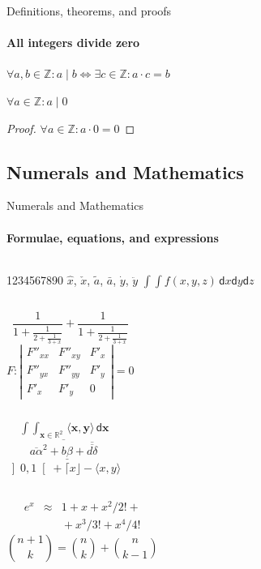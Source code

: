 \documentclass{beamer}
\begin{document}
\begin{frame}[label=proof]{Definitions, theorems, and proofs}
    \framesubtitle{All integers divide zero}
    \begin{definition}
    $\forall a,b\in\mathds{Z}: a\mid b\iff\exists c\in\mathds{Z}:a\cdot c=b$
    \end{definition}
    \begin{theorem}
    $\forall a\in\mathds{Z}: a\mid 0$
    \end{theorem}
    \begin{proof}
    $\forall a\in\mathds{Z}: a\cdot 0=0$
    \end{proof}
\end{frame}

\subsection{Numerals and Mathematics}
\begin{frame}[label=math]{Numerals and Mathematics}
    \framesubtitle{Formulae, equations, and expressions}
    \begin{columns}[onlytextwidth]
        1234567890
        $\hat{x}$, $\check{x}$, $\tilde{a}$,
        $\bar{a}$, $\dot{y}$, $\ddot{y}$
        $\int \!\! \int f(x,y,z)\,\mathsf{d}x\mathsf{d}y\mathsf{d}z$
    \end{columns}
    \begin{columns}[onlytextwidth]
        $$\frac{1}{\displaystyle 1+
        \frac{1}{\displaystyle 2+
        \frac{1}{\displaystyle 3+x}}} +
        \frac{1}{1+\frac{1}{2+\frac{1}{3+x}}}$$
        $$F:\left| \begin{array}{ccc}
        F''_{xx} & F''_{xy} &  F'_x \\
        F''_{yx} & F''_{yy} &  F'_y \\
        F'_x     & F'_y     & 0
        \end{array}\right| = 0$$
    \end{columns}
    \begin{columns}[onlytextwidth]
        $$\mathop{\int \!\!\! \int}_{\mathbf{x} \in \mathds{R}^2}
        \! \langle \mathbf{x},\mathbf{y}\rangle\,\mathsf{d}\mathbf{x}$$
        $$\overline{\overline{a\alpha}^2+\underline{b\beta}
        +\overline{\overline{d\delta}}}$$
        $\left] 0,1\right[ + \lceil x \rfloor - \langle x,y\rangle$
    \end{columns}
    \begin{columns}[onlytextwidth]
        \begin{eqnarray*}
        e^x &\approx& 1+x+x^2/2! + \\
            && {}+x^3/3! + x^4/4!
        \end{eqnarray*}
        $${n+1\choose k} = {n\choose k} + {n \choose k-1}$$
    \end{columns}
\end{frame}
\end{document}
